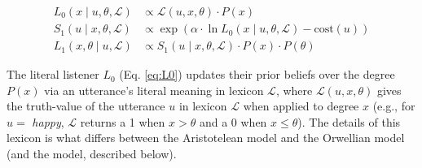 \documentclass[floatsintext,doc]{apa6}
\begin{document}

\begin{align}
L_{0}(x \mid u, \theta, \mathcal{L}) &\propto \mathcal{L}(u, x, \theta) \cdot P(x) \label{eq:L0} \\
S_{1}(u \mid x, \theta, \mathcal{L}) &\propto \exp{(\alpha \cdot \ln {L_{0}(x \mid u, \theta, \mathcal{L})} - \text{cost}(u))} \label{eq:S1}\\
L_{1}(x, \theta \mid u,  \mathcal{L}) &\propto S_{1}(u \mid x, \theta, \mathcal{L}) \cdot P(x) \cdot  P(\theta) \label{eq:L1}
\end{align}


The literal listener \(L_0\) (Eq. \ref{eq:L0}) updates their prior beliefs over the degree \(P(x)\) via an utterance's literal meaning in lexicon \(\mathcal{L}\),
where \(\mathcal{L}(u, x, \theta)\) gives the truth-value of the utterance \(u\) in lexicon \(\mathcal{L}\) when applied to degree \(x\) (e.g., for $u= $ \emph{happy}, $\mathcal{L}$ returns a 1 when $x>\theta$ and a 0 when  $x\leq\theta$).
The details of this lexicon is what differs between  the Aristotelean model and the Orwellian model (and the \ourmodel model, described below).
\end{document}
